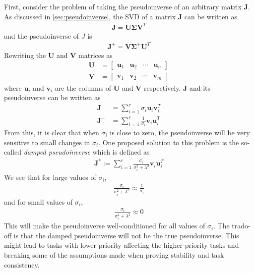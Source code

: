 First, consider the problem of taking the pseudoinverse of an arbitrary matrix $\bm{J}$.
As discussed in \autoref{sec:pseudoinverse}, the SVD of a matrix $\bm{J}$ can be
written as
\begin{align}
    \bm{J} = \bm{U} \bm{\Sigma} \bm{V}^T
\end{align}
and the pseudoinverse of $J$ is
\begin{align}
    \bm{J}^+ = \bm{V} \bm{\Sigma}^+ \bm{U}^T
\end{align}
Rewriting the $\bm{U}$ and $\bm{V}$ matrices as
\begin{subequations}
\begin{align}
    \bm{U} &= \begin{bmatrix} \bm{u}_1 & \bm{u}_2 & \cdots & \bm{u}_n \end{bmatrix} \\
    \bm{V} &= \begin{bmatrix} \bm{v}_1 & \bm{v}_2 & \cdots & \bm{v}_m \end{bmatrix}
\end{align}
\end{subequations}
where $\bm{u}_i$ and $\bm{v}_i$ are the columns of $\bm{U}$ and $\bm{V}$ respectively.
$\bm{J}$ and its pseudoinverse can be written as
\begin{subequations}
\begin{align}
    \bm{J} &= \sum_{i=1}^r \sigma_i \bm{u}_i \bm{v}_i^T \\
    \bm{J}^+ &= \sum_{i=1}^r \frac{1}{\sigma_i} \bm{v}_i \bm{u}_i^T
\end{align}
\end{subequations}
From this, it is clear that when $\sigma_i$ is close to zero, the pseudoinverse
will be very sensitive to small changes in $\sigma_i$. One proposed solution to
this problem is the so-called \emph{damped pseudoinverse} which is defined as
\begin{align}
    \bm{J}^* := \sum_{i=1}^r \frac{\sigma_i}{\sigma_i^2 + \lambda^2} \bm{v}_i \bm{u}_i^T
\end{align}
We see that for large values of $\sigma_i$,
\begin{align}
    \frac{\sigma_i}{\sigma_i^2 + \lambda^2} \approx \frac{1}{\sigma_i}
\end{align}
and for small values of $\sigma_i$,
\begin{align}
    \frac{\sigma_i}{\sigma_i^2 + \lambda^2} \approx 0
\end{align}
This will make the pseudoinverse well-conditioned for all values of $\sigma_i$.
The trado-off is that the damped pseudoinverse will not be the true pseudoinverse.
This might lead to tasks with lower priority affecting the higher-priority tasks and
breaking some of the assumptions made when proving stability and task consistency.

